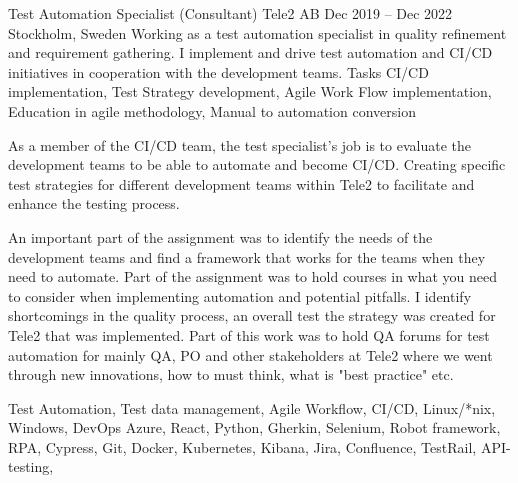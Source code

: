 \documentclass{sobCV}[2015/09/08]
\begin{document}
\experiencenode
{Test Automation Specialist (Consultant)}
{Tele2 AB}
{Dec 2019 -- Dec 2022}
{Stockholm, Sweden}{
	Working as a test automation specialist in quality refinement and
	requirement gathering. I implement and drive test automation and CI/CD
	initiatives in cooperation with the development teams.
}
{Tasks}{
	CI/CD implementation,
	Test Strategy development,
	Agile Work Flow implementation,
	Education in agile methodology,
	Manual to automation conversion
}{
	 {
		As a member of the CI/CD team, the test specialist's job is to
		evaluate the development teams to be able to automate and become
		CI/CD. Creating specific test strategies for different development
		teams within Tele2 to facilitate and enhance the testing process.
	}

	 {
		An important part of the assignment was to identify the needs of the
		development teams and find a framework that works for the teams when
		they need to automate. Part of the assignment was to hold courses in
		what you need to consider when implementing automation and potential
		pitfalls.
	}
	 {
		I identify shortcomings in the quality process, an overall test
		the strategy was created for Tele2 that was implemented. Part of this
		work was to hold QA forums for test automation for mainly QA, PO and
		other stakeholders at Tele2 where we went through new innovations,
		how to must think, what is "best practice" etc.
	}
}{
	Test Automation,
	Test data management,
	Agile Workflow,
	CI/CD,
	Linux/*nix,
	Windows,
	DevOps Azure,
	React,
	Python,
	Gherkin,
	Selenium,
	Robot framework,
	RPA,
	Cypress,
	Git,
	Docker,
	Kubernetes,
	Kibana,
	Jira,
	Confluence,
	TestRail,
	API-testing,
}
\end{document}

